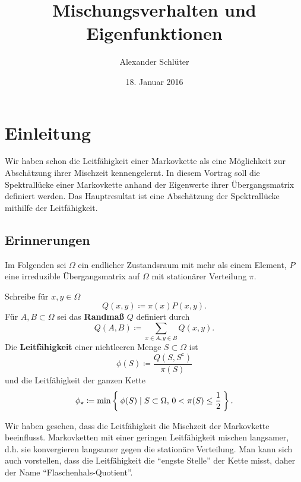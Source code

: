 \documentclass[ngerman,a4paper,11pt]{scrartcl}
\newcommand{\stcomp}[1]{{#1}^{\mathsf{c}}} %
\begin{document}
\title{Mischungsverhalten und Eigenfunktionen}
\author{Alexander Schlüter}
\date{18. Januar 2016}
\maketitle

\section{Einleitung}
Wir haben schon die Leitfähigkeit einer Markovkette als eine Möglichkeit zur
Abschätzung ihrer Mischzeit kennengelernt. In diesem Vortrag soll die
Spektrallücke einer Markovkette anhand der Eigenwerte ihrer Übergangsmatrix
definiert werden. Das Hauptresultat ist eine Abschätzung der Spektrallücke
mithilfe der Leitfähigkeit.

\subsection{Erinnerungen}
Im Folgenden sei $\Omega$ ein endlicher Zustandsraum mit mehr als einem Element, $P$ eine irreduzible Übergangsmatrix auf $\Omega$ mit stationärer Verteilung $\pi$.
\begin{defn}
 Schreibe für $x, y\in\Omega$ 
 \begin{equation*}
  Q(x,y)\coloneqq\pi(x)P(x,y).
 \end{equation*}
 Für $A, B\subset\Omega$ sei das \textbf{Randmaß} $Q$ definiert durch
 \begin{equation*}
   Q(A,B)\coloneqq\sum_{x\in A, y\in B}Q(x,y). 
 \end{equation*}
 Die \textbf{Leitfähigkeit} einer nichtleeren Menge $S\subset\Omega$ ist
 \begin{equation*}
  \phi(S)\coloneqq\frac{Q(S,\stcomp{S})}{\pi(S)} 
 \end{equation*}
 und die Leitfähigkeit der ganzen Kette
 \begin{equation*}
  \phi_\star\coloneqq\min\Set{\phi(S)\mid S\subset\Omega,\,0<\pi(S)\leq\frac{1}{2}}.
 \end{equation*}
\end{defn}
Wir haben gesehen, dass die Leitfähigkeit die Mischzeit der Markovkette
beeinflusst. Markovketten mit einer geringen Leitfähigkeit mischen langsamer,
d.h. sie konvergieren langsamer gegen die stationäre Verteilung. Man kann sich
auch vorstellen, dass die Leitfähigkeit die \enquote{engste Stelle} der Kette misst,
daher der Name \enquote{Flaschenhals-Quotient}.
\end{document}
